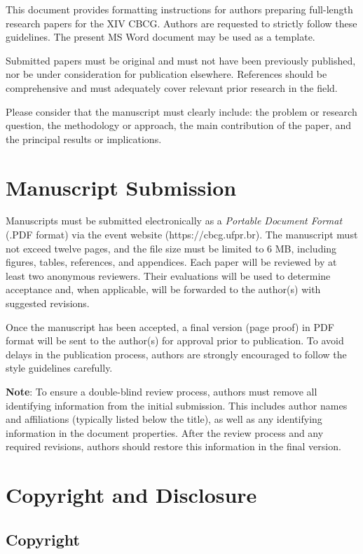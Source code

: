 \documentclass[12pt,a4paper]{article}
\begin{document}
This document provides formatting instructions for authors preparing
full-length research papers for the XIV CBCG. Authors are requested to
strictly follow these guidelines. The present MS Word document may be
used as a template.

Submitted papers must be original and must not have been previously
published, nor be under consideration for publication elsewhere.
References should be comprehensive and must adequately cover relevant
prior research in the field.

Please consider that the manuscript must clearly include: the problem or
research question, the methodology or approach, the main contribution of
the paper, and the principal results or implications.

\section{Manuscript Submission}

Manuscripts must be submitted electronically as a \emph{Portable
Document Format} (.PDF format) via the event website
(https://cbcg.ufpr.br). The manuscript must not exceed twelve pages, and
the file size must be limited to 6 MB, including figures, tables,
references, and appendices. Each paper will be reviewed by at least two
anonymous reviewers. Their evaluations will be used to determine
acceptance and, when applicable, will be forwarded to the author(s) with
suggested revisions.

Once the manuscript has been accepted, a final version (page proof) in
PDF format will be sent to the author(s) for approval prior to
publication. To avoid delays in the publication process, authors are
strongly encouraged to follow the style guidelines carefully.

\textbf{Note}: To ensure a double-blind review process, authors must
remove all identifying information from the initial submission. This
includes author names and affiliations (typically listed below the
title), as well as any identifying information in the document
properties. After the review process and any required revisions, authors
should restore this information in the final version.

\section{Copyright and Disclosure}

\subsection{Copyright}
\end{document}
